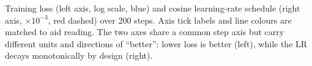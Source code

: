 \caption{Training loss (left axis, log scale, blue) and cosine learning-rate schedule
(right axis, $\times10^{-3}$, red dashed) over 200 steps.
Axis tick labels and line colours are matched to aid reading.
The two axes share a common step axis but carry different units and directions of
``better'': lower loss is better (left), while the LR decays monotonically by design (right).}
